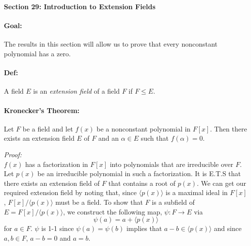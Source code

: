 \documentclass[10pt,a4paper]{article}
\begin{document}
\begin{center}
\textbf{Section 29: Introduction to Extension Fields}
\end{center}

\paragraph{Goal:} The results in this section will allow us to prove that every nonconstant polynomial has a zero.

\paragraph{Def:} A field $E$ is an \textit{extension field} of a field $F$ if $F \leq E$.

\paragraph{Kronecker's Theorem:} Let $F$ be a field and let $f(x)$ be a nonconstant polynomial in $F[x]$. Then there exists an extension field $E$ of $F$ and an $\alpha \in E$ such that $f(\alpha) =0$.

\begin{flushleft}
\textit{Proof:} \\
$f(x)$ has a factorization in $F[x]$ into polynomials that are irreducible over $F$. 
Let $p(x)$ be an irreducible polynomial in such a factorization.
It is E.T.S that there exists an extension field of $F$ that contains a root of $p(x)$.
We can get our required extension field by noting that, since $\langle p(x) \rangle$ is a maximal ideal in $F[x]$, $F[x]/\langle p(x) \rangle$ must be a field. To show that $F$ is a subfield of $E = F[x]/ \langle  p(x) \rangle$, we construct the following map, $\psi: F \to E$ via $$ \psi(a) = a + \langle p(x) \rangle$$ for $a \in F$. $\psi$ is 1-1 since $\psi(a) = \psi(b)$ implies that $a-b \in \langle p(x) \rangle$ and since $a,b \in F$, $a-b=0$ and $a=b$. 
\end{flushleft}
\end{document}
